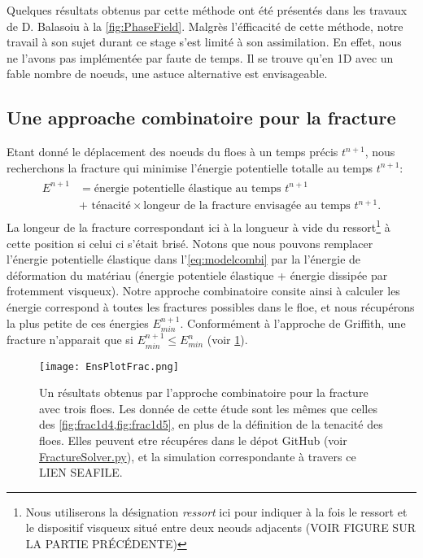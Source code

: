 Quelques résultats obtenus par cette méthode ont été présentés dans les travaux de D. Balasoiu à la \cref{fig:PhaseField}. Malgrès l'éfficacité de cette méthode, notre travail à son sujet durant ce stage s'est limité à son assimilation. En effet, nous ne l'avons pas implémentée par faute de temps. Il se trouve qu'en 1D avec un fable nombre de noeuds, une astuce alternative est envisageable. 




\subsection{Une approache combinatoire pour la fracture}
\label{subsubsec:approchecombi}


Etant donné le déplacement des noeuds du floes à un temps précis $t^{n+1}$, nous recherchons la fracture qui minimise l'énergie potentielle totalle au temps $t^{n+1}$:
\begin{align} \label{eq:modelcombi}
    \boxed{
    \begin{array}{rll}
    E^{n+1} & = \text{énergie potentielle élastique au temps } t^{n+1}  \\
    & + \text{ ténacité}\times \text{longeur de la fracture envisagée au temps }t^{n+1}.  
    \end{array}
    }
\end{align}
La longeur de la fracture correspondant ici à la longueur à vide du ressort\footnote{Nous utiliserons la désignation \emph{ressort} ici pour indiquer à la fois le ressort et le dispositif visqueux situé entre deux neouds adjacents (VOIR FIGURE SUR LA PARTIE PRÉCÉDENTE)} à cette position si celui ci s'était brisé. Notons que nous pouvons remplacer l'énergie potentielle élastique dans l'\cref{eq:modelcombi} par la l'énergie de déformation du matériau (énergie potentiele élastique + énergie dissipée par frotemment visqueux). Notre approche combinatoire consite ainsi à calculer les énergie correspond à toutes les fractures possibles dans le floe, et nous récupérons la plus petite de ces énergies $E^{n+1}_{min}$. Conformément à l'approche de Griffith, une fracture n'apparait que si $E^{n+1}_{min}\leq E^{n}_{min}$ (voir \cref{fig:fracture1d6}). 
\begin{figure}[!h]
    \centering
    \texttt{[image: EnsPlotFrac.png]}
    \caption{Un résultats obtenus par l'approche combinatoire pour la fracture avec trois floes. Les donnée de cette étude sont les mêmes que celles des \cref{fig:frac1d4,fig:frac1d5}, en plus de la définition de la tenacité des floes. Elles peuvent etre récupéres dans le dépot GitHub (voir \href{https://github.com/desmond-rn/ice-floes/blob/master/code/simu1D/FractureSolver.py}{FractureSolver.py}), et la simulation correspondante à travers ce LIEN SEAFILE.}
    \label{fig:fracture1d6}
\end{figure}

